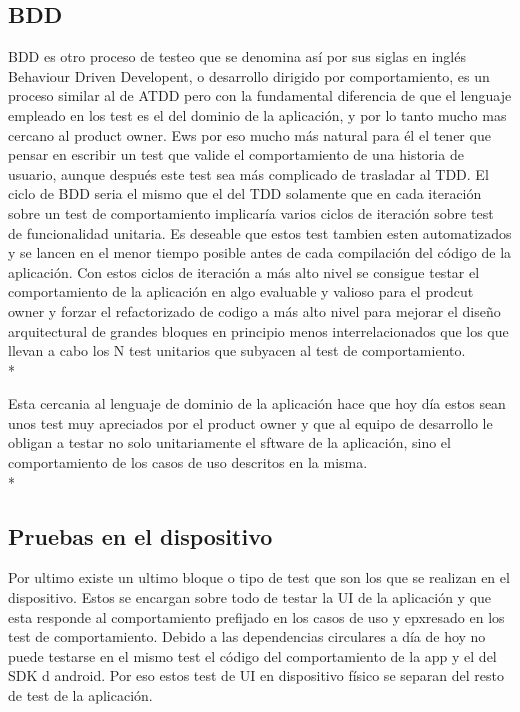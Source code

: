 \documentclass[../pfc.tex]{subfiles}
\begin{document}
	\subsection{BDD}
	
	BDD es otro proceso de testeo que se denomina así por sus siglas en inglés Behaviour Driven Developent, o desarrollo dirigido por comportamiento, es un proceso similar al de ATDD pero con la fundamental diferencia de que el lenguaje empleado en los test es el del dominio de la aplicación, y por lo tanto mucho mas cercano al product owner. Ews por eso mucho más natural para él el tener que pensar en escribir un test que valide el comportamiento de una historia de usuario, aunque después este test sea más complicado de trasladar al TDD. El ciclo de BDD seria el mismo que el del TDD solamente que en cada iteración sobre un test de comportamiento implicaría varios ciclos de iteración sobre test de funcionalidad unitaria. Es deseable que estos test tambien esten automatizados y se lancen en el menor tiempo posible antes de cada compilación del código de la aplicación. Con estos ciclos de iteración a más alto nivel se consigue testar el comportamiento de la aplicación en algo evaluable y valioso para el prodcut owner y forzar el refactorizado de codigo a más alto nivel para mejorar el diseño arquitectural de grandes bloques en principio menos interrelacionados que los que llevan a cabo los N test unitarios que subyacen al test de comportamiento.\\*
	
	Esta cercania al lenguaje de dominio de la aplicación hace que hoy día estos sean unos test muy apreciados por el product owner y que al equipo de desarrollo le obligan a testar no solo unitariamente el sftware de la aplicación, sino el comportamiento de los casos de uso descritos en la misma.\\* 
		
	\subsection{Pruebas en el dispositivo}
	
	Por ultimo existe un ultimo bloque  o tipo de test que son los que se realizan en el dispositivo. Estos se encargan sobre todo de testar la UI de la aplicación y que esta responde al comportamiento prefijado en los casos de uso y epxresado en los test de comportamiento. Debido a las dependencias circulares a día de hoy no puede testarse en el mismo test el código del comportamiento de la app y el del SDK d android. Por eso estos test de UI en dispositivo físico se separan del resto de test de la aplicación.
	
\end{document}
